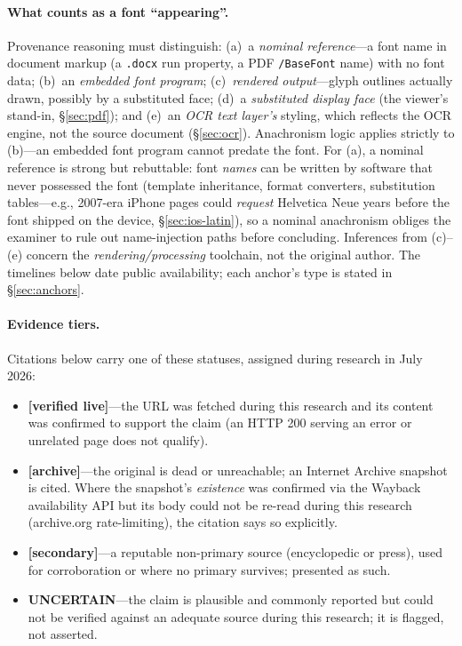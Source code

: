 \documentclass[10pt,a4paper]{article}
\newcommand{\code}[1]{\texttt{#1}}
\begin{document}
\paragraph{What counts as a font ``appearing''.} Provenance reasoning must
distinguish: (a)~a \emph{nominal reference}---a font name in document markup (a
\code{.docx} run property, a PDF \code{/BaseFont} name) with no font data; (b)~an
\emph{embedded font program}; (c)~\emph{rendered output}---glyph outlines actually
drawn, possibly by a substituted face; (d)~a \emph{substituted display face} (the
viewer's stand-in, \S\ref{sec:pdf}); and (e)~an \emph{OCR text layer's} styling,
which reflects the OCR engine, not the source document
(\S\ref{sec:ocr}). Anachronism logic applies strictly to (b)---an embedded font
program cannot predate the font. For (a), a nominal reference is strong but
rebuttable: font \emph{names} can be written by software that never possessed the
font (template inheritance, format converters, substitution tables---e.g., 2007-era
iPhone pages could \emph{request} Helvetica Neue years before the font shipped on the
device, \S\ref{sec:ios-latin}), so a nominal anachronism obliges the examiner to
rule out name-injection paths before concluding. Inferences from (c)--(e) concern the
\emph{rendering/processing} toolchain, not the original author. The timelines below
date public availability; each anchor's type is stated in \S\ref{sec:anchors}.

\paragraph{Evidence tiers.} Citations below carry one of these statuses, assigned
during research in July 2026:
\begin{itemize}[leftmargin=1.3em,itemsep=1pt]
  \item \textbf{[verified live]}---the URL was fetched during this research and its
        content was confirmed to support the claim (an HTTP 200 serving an error or
        unrelated page does not qualify).
  \item \textbf{[archive]}---the original is dead or unreachable; an Internet Archive
        snapshot is cited. Where the snapshot's \emph{existence} was confirmed via
        the Wayback availability API but its body could not be re-read during this
        research (archive.org rate-limiting), the citation says so explicitly.
  \item \textbf{[secondary]}---a reputable non-primary source (encyclopedic or
        press), used for corroboration or where no primary survives; presented as
        such.
  \item \textbf{UNCERTAIN}---the claim is plausible and commonly reported but could
        not be verified against an adequate source during this research; it is
        flagged, not asserted.
\end{itemize}
\end{document}
